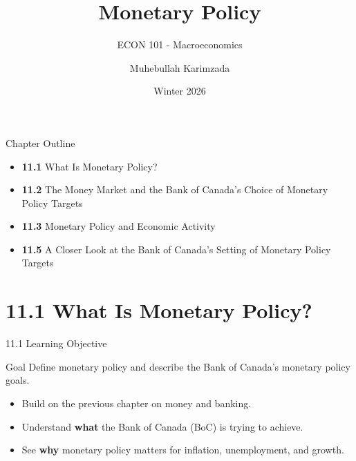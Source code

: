 \documentclass[aspectratio=169]{beamer}
\title{\textbf{Monetary Policy \vspace{.5cm}\\  }}
\subtitle{ {\large ECON 101 - Macroeconomics}}
\author{Muhebullah Karimzada}
\date{Winter 2026}
\begin{document}
\begin{frame}[plain]
  \titlepage
\end{frame}

\begin{frame}{Chapter Outline}
\transfade
\begin{itemize}
  \item \textbf{11.1} What Is Monetary Policy?
  \item \textbf{11.2} The Money Market and the Bank of Canada’s Choice of Monetary Policy Targets
  \item \textbf{11.3} Monetary Policy and Economic Activity
  \item \textbf{11.5} A Closer Look at the Bank of Canada’s Setting of Monetary Policy Targets
\end{itemize}
\end{frame}

\section{11.1 What Is Monetary Policy?}

\begin{frame}{11.1 Learning Objective}
\transfade
\begin{block}{Goal}
Define monetary policy and describe the Bank of Canada’s monetary policy goals.
\end{block}
\begin{itemize}
  \item Build on the previous chapter on money and banking.
  \item Understand \textbf{what} the Bank of Canada (BoC) is trying to achieve.
  \item See \textbf{why} monetary policy matters for inflation, unemployment, and growth.
\end{itemize}
\end{frame}
\end{document}
